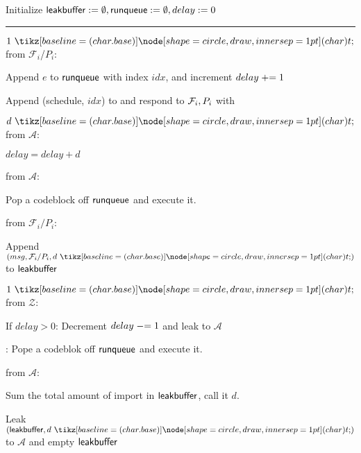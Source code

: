 \begin{bbox}[title={\textbf{Wrapper} $\mathcal{W}_{\msf{async}}$} ]

Initialize ${\mathsf {leakbuffer}} := \emptyset, {\mathsf {runqueue}} := \emptyset, delay := 0$

\vspace{2mm} \hrule \vspace{2mm}

\OnInput {} $1 \token$ from $\mathcal{F}_i$/$P_i$:
	\begin{ritemize}

		\item Append $e$ to ${\mathsf {runqueue}}$ with index $idx$, and increment $delay \mathrel{+}= 1$
		\item Append (schedule, $idx$) to  and respond to $\mathcal{F}_i,P_i$ with 

	\end{ritemize}

\OnInput {} $d \token$ from $\mathcal{A}$:
	\begin{ritemize}
		\item $delay = delay + d$
	\end{ritemize}

\OnInput {} from $\mathcal{A}$:
	\begin{ritemize}	
		\item Pop a codeblock off ${\mathsf {runqueue}}$  and execute it.
	\end{ritemize} 

\OnInput {} from $\mathcal{F}_i/P_i$:
	\begin{ritemize}
		\item Append $(msg, \mathcal{F}_i/P_i, d \token)$ to ${\mathsf {leakbuffer}}$
	\end{ritemize}

\OnInput {} $1 \token$ from $\mathcal{Z}$:
	\begin{ritemize}
		\item If $delay > 0$:
			Decrement $delay \mathrel{-}= 1$ and leak  to $\mathcal{A}$
		\item \Else: 
			Pope a codeblok off ${\mathsf {runqueue}}$ and execute it.
	\end{ritemize}

\OnInput {} from $\mathcal{A}$:
	\begin{ritemize}
		\item Sum the total amount of import in ${\mathsf {leakbuffer}}$, call it $d$.
		\item Leak $(\msf{leakbuffer},d \token)$ to $\mathcal{A}$ and empty ${\mathsf {leakbuffer}}$
	\end{ritemize}
\end{bbox}
